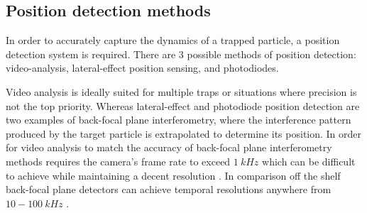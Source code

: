 \subsection{Position detection methods}
In order to accurately capture the dynamics of a trapped particle, a 
position detection system is required. There are 3 possible methods 
of position detection: video-analysis, lateral-effect position sensing, 
and photodiodes. 

Video analysis is ideally suited for multiple traps or situations where 
precision is not the top priority. Whereas lateral-effect and photodiode 
position detection are two examples of back-focal plane interferometry, 
where the interference pattern produced by the target particle is 
extrapolated to determine its position. In order for video analysis to 
match the accuracy of back-focal plane interferometry methods requires 
the camera's frame rate to exceed $1\ kHz$ which can be difficult to 
achieve while maintaining a decent resolution \cite{Gibson2008}. In 
comparison off the shelf back-focal plane detectors can achieve temporal 
resolutions anywhere from $10-100\ kHz$ \cite{BergSoerensen2004}. 
 
